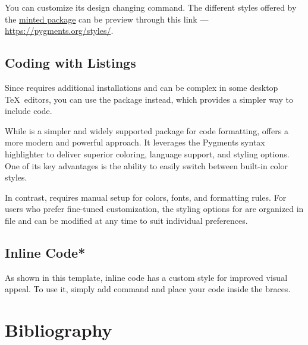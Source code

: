 \documentclass[9pt,a4paper,twocolumn,twoside]{tau-class/tau}
\begin{document}
		\begin{code}
			\inputminted{python}{example.py}
            \caption{Python code example with minted.}
			\label{lst:example}
		\end{code}
		
		You can customize its design changing \inlinecode{\usemintedstyle} command. The different styles offered by the \href{https://ctan.org/pkg/minted}{minted package} can be preview through this link — \url{https://pygments.org/styles/}.

    \subsection{Coding with Listings}
	
		Since  requires additional installations and can be complex in some desktop \TeX\ editors, you can use the  package instead, which provides a simpler way to include code.
		
		\begin{code}
			
			\label{lst:example2}
            \caption{Python code example with listings.}
		\end{code}
		
		While  is a simpler and widely supported package for code formatting,  offers a more modern and powerful approach. It leverages the Pygments syntax highlighter to deliver superior coloring, language support, and styling options. One of its key advantages is the ability to easily switch between built-in color styles.
		
		In contrast,  requires manual setup for colors, fonts, and formatting rules.
		For users who prefer fine-tuned customization, the styling options for  are organized in  file and can be modified at any time to suit individual preferences.

	\subsection{Inline Code*}
	
		As shown in this template, inline code has a custom style for improved visual appeal. To use it, simply add \inlinecode{\inlinecode{}} command and place your code inside the braces.

\section{Bibliography}
		
\end{document}

